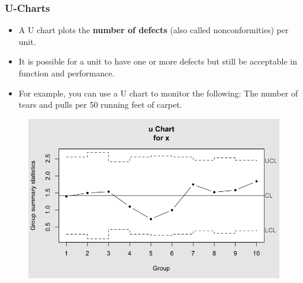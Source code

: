 \documentclass[Charts101.tex]{subfiles}
\begin{document}
	\begin{frame}
\frametitle{U-Charts}	
\large
\begin{itemize}
\item A U chart plots the \textbf{number of defects} (also called nonconformities) per unit. 
\item It is possible for a unit to have one or more defects but still be acceptable in function and performance.
\item  For example, you can use a U chart to monitor the following: The number of tears and pulls per 50 running feet of carpet.
\end{itemize}

\end{frame}
\begin{frame}
	\begin{figure}
\centering
\includegraphics[width=1.0\linewidth]{u-chart-R}
\end{figure}
\end{frame}
\end{document}
